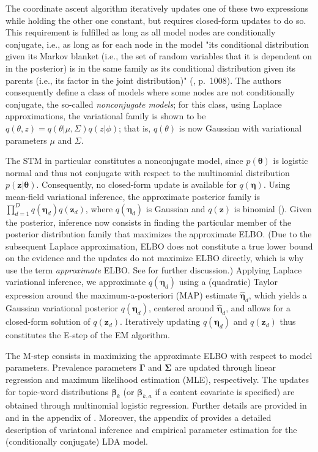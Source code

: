 The coordinate ascent algorithm iteratively updates one of these two expressions while holding the other one constant, but requires closed-form updates to do so. This requirement is fulfilled as long as all model nodes are conditionally conjugate, i.e., as long as for each node in the model "its conditional distribution given its Markov blanket (i.e., the set of random variables that it is dependent on in the posterior) is in the same family as its conditional distribution given its parents (i.e., its factor in the joint distribution)" (\cite{wang2013variational}, p.\ 1008). The authors consequently define a class of models where some nodes are not conditionally conjugate, the so-called \textit{nonconjugate models}; for this class, using Laplace approximations, the variational family is shown to be $q(\theta,z) = q(\theta|\mu,\Sigma)q(z|\phi)$; that is, $q(\theta)$ is now Gaussian with variational parameters $\mu$ and $\Sigma$.

The STM in particular constitutes a nonconjugate model, since $p(\boldsymbol{\theta})$ is logistic normal and thus not conjugate with respect to the multinomial distribution $p(\boldsymbol{z}|\boldsymbol{\theta})$. Consequently, no closed-form update is available for $q(\boldsymbol{\eta})$. Using mean-field variational inference, the approximate posterior family is $\prod_{d=1}^{D}q(\boldsymbol{\eta}_d)q(\boldsymbol{z}_d)$, where $q(\boldsymbol{\eta}_d)$ is Gaussian and $q(\boldsymbol{z})$ is binomial (\citealp{roberts2016model}). Given the posterior, inference now consists in finding the particular member of the posterior distribution family that maximizes the approximate ELBO. (Due to the subsequent Laplace approximation, ELBO does not constitute a true lower bound on the evidence and the updates do not maximize ELBO directly, which is why \cite{roberts2013structural} use the term \textit{approximate} ELBO. See \cite{wang2013variational} for further discussion.) Applying Laplace variational inference, we approximate $q(\boldsymbol{\eta}_d)$ using a (quadratic) Taylor expression around the maximum-a-posteriori (MAP) estimate $\hat{\boldsymbol{\eta}}_d$, which yields a Gaussian variational posterior $q(\boldsymbol{\eta}_d)$, centered around $\hat{\boldsymbol{\eta}}_d$, and allows for a closed-form solution of $q(\boldsymbol{z}_d)$. Iteratively updating $q(\boldsymbol{\eta}_d)$ and $q(\boldsymbol{z}_d)$ thus constitutes the E-step of the EM algorithm.

The M-step consists in maximizing the approximate ELBO with respect to model parameters. Prevalence parameters $\boldsymbol{\Gamma}$ and $\boldsymbol{\Sigma}$ are updated through linear regression and maximum likelihood estimation (MLE), respectively. The updates for topic-word distributions $\boldsymbol{\beta}_k$ (or $\boldsymbol{\beta}_{k,a}$ if a content covariate is specified) are obtained through multinomial logistic regression. Further details are provided in \cite{roberts2013structural} and in the appendix of \cite{roberts2013structural}. Moreover, the appendix of \cite{blei2003latent} provides a detailed description of variatonal inference and empirical parameter estimation for the (conditionally conjugate) LDA model.

